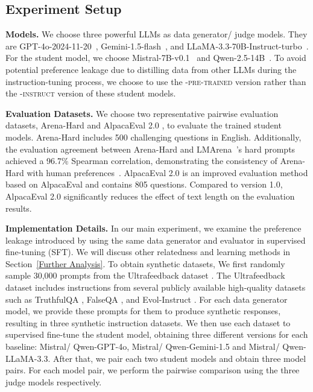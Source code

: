 \documentclass{article} %
\begin{document}


\subsection{Experiment Setup}

\textbf{Models.} We choose three powerful LLMs as data generator/ judge models. They are GPT-4o-2024-11-20~\cite{achiam2023gpt}, Gemini-1.5-flash~\cite{team2024gemini}, and LLaMA-3.3-70B-Instruct-turbo~\cite{dubey2024llama}. For the student model, we choose Mistral-7B-v0.1~\cite{jiang2023mistral} and Qwen-2.5-14B~\cite{yang2024qwen2}. To avoid potential preference leakage due to distilling data from other LLMs during the instruction-tuning process, we choose to use the \textsc{-pre-trained} version rather than the \textsc{-instruct} version of these student models.

\textbf{Evaluation Datasets.} We choose two representative pairwise evaluation datasets, Arena-Hard \cite{li2024crowdsourced} and AlpacaEval 2.0 \cite{dubois2024length}, to evaluate the trained student models. Arena-Hard includes 500 challenging questions in English. Additionally, the evaluation agreement between Arena-Hard and LMArena~\cite{zheng2023judging}'s hard prompts achieved a 96.7\% Spearman correlation, demonstrating the consistency of Arena-Hard with human preferences~\cite{li2024crowdsourced}. AlpacaEval 2.0 is an improved evaluation method based on AlpacaEval \cite{li2023alpacaeval} and contains 805 questions. Compared to version 1.0, AlpacaEval 2.0 significantly reduces the effect of text length on the evaluation results.

\textbf{Implementation Details.} 
In our main experiment, we examine the preference leakage introduced by using the same data generator and evaluator in supervised fine-tuning (SFT). We will discuss other relatedness and learning methods in Section~\ref{Further Analysis}. To obtain synthetic datasets, We first randomly sample 30,000 prompts from the Ultrafeedback dataset \cite{cui2024ultrafeedback}. The Ultrafeedback dataset includes instructions from several publicly available high-quality datasets such as TruthfulQA \cite{lin2022truthfulqa}, FalseQA \cite{hu2023won}, and Evol-Instruct \cite{xu2023wizardlm}. For each data generator model, we provide these prompts for them to produce synthetic responses, resulting in three synthetic instruction datasets. We then use each dataset to supervised fine-tune the student model, obtaining three different versions for each baseline: Mistral/ Qwen-GPT-4o, Mistral/ Qwen-Gemini-1.5 and Mistral/ Qwen-LLaMA-3.3. After that, we pair each two student models and obtain three model pairs. For each model pair, we perform the pairwise comparison using the three judge models respectively.
\end{document}
